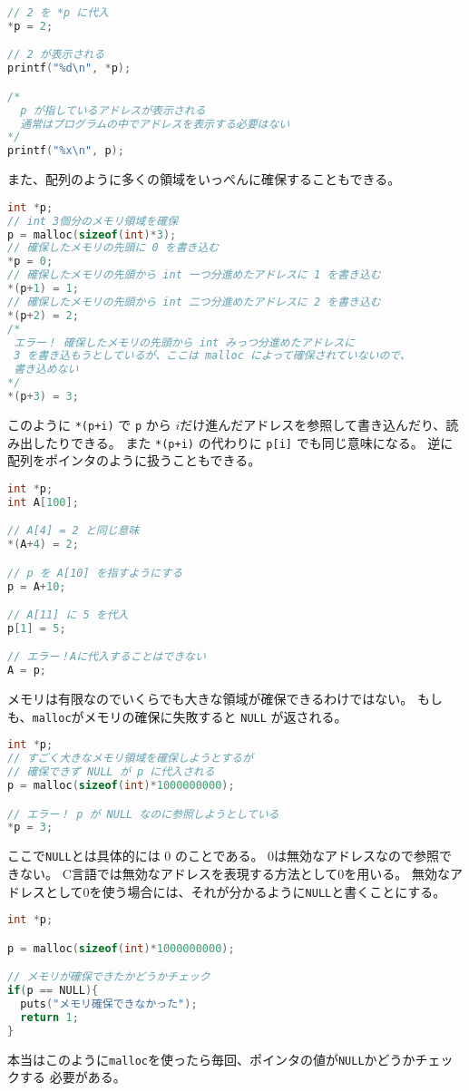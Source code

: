 \documentclass[a4paper,twoside,onecolumn,openany,article]{memoir}
\theoremstyle{remark}
\begin{document}
\begin{lstlisting}[basicstyle=\ttfamily\small,showstringspaces=false,language=C,frame=single]
// 2 を *p に代入
*p = 2;

// 2 が表示される
printf("%d\n", *p);

/*
  p が指しているアドレスが表示される
  通常はプログラムの中でアドレスを表示する必要はない
*/
printf("%x\n", p);
\end{lstlisting}
また、配列のように多くの領域をいっぺんに確保することもできる。
\begin{lstlisting}[basicstyle=\ttfamily\small,showstringspaces=false,language=C,frame=single]
int *p;
// int 3個分のメモリ領域を確保
p = malloc(sizeof(int)*3);
// 確保したメモリの先頭に 0 を書き込む
*p = 0;
// 確保したメモリの先頭から int 一つ分進めたアドレスに 1 を書き込む
*(p+1) = 1;
// 確保したメモリの先頭から int 二つ分進めたアドレスに 2 を書き込む
*(p+2) = 2;
/*
 エラー！ 確保したメモリの先頭から int みっつ分進めたアドレスに
 3 を書き込もうとしているが、ここは malloc によって確保されていないので、
 書き込めない
*/
*(p+3) = 3;
\end{lstlisting}
このように \texttt{*(p+i)} で \texttt{p} から $i$だけ進んだアドレスを参照して書き込んだり、読み出したりできる。
また \texttt{*(p+i)} の代わりに \texttt{p[i]} でも同じ意味になる。
逆に配列をポインタのように扱うこともできる。
\begin{lstlisting}[basicstyle=\ttfamily\small,showstringspaces=false,language=C,frame=single]
int *p;
int A[100];

// A[4] = 2 と同じ意味
*(A+4) = 2;

// p を A[10] を指すようにする
p = A+10;

// A[11] に 5 を代入
p[1] = 5;

// エラー！Aに代入することはできない
A = p;
\end{lstlisting}
メモリは有限なのでいくらでも大きな領域が確保できるわけではない。
もしも、\texttt{malloc}がメモリの確保に失敗すると \texttt{NULL} が返される。
\begin{lstlisting}[basicstyle=\ttfamily\small,showstringspaces=false,language=C,frame=single]
int *p;
// すごく大きなメモリ領域を確保しようとするが
// 確保できず NULL が p に代入される
p = malloc(sizeof(int)*1000000000);

// エラー！ p が NULL なのに参照しようとしている
*p = 3;
\end{lstlisting}
ここで\texttt{NULL}とは具体的には 0 のことである。
0は無効なアドレスなので参照できない。
C言語では無効なアドレスを表現する方法として0を用いる。
無効なアドレスとして0を使う場合には、それが分かるように\texttt{NULL}と書くことにする。
\begin{lstlisting}[basicstyle=\ttfamily\small,showstringspaces=false,language=C,frame=single]
int *p;

p = malloc(sizeof(int)*1000000000);

// メモリが確保できたかどうかチェック
if(p == NULL){
  puts("メモリ確保できなかった");
  return 1;
}

\end{lstlisting}
本当はこのように\texttt{malloc}を使ったら毎回、ポインタの値が\texttt{NULL}かどうかチェックする
必要がある。
\end{document}

